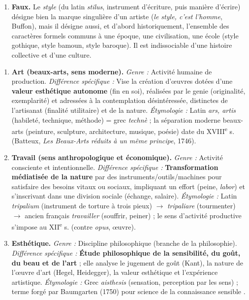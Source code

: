 \documentclass[11pt]{article}
\newcommand{\cle}[1]{{\popxbold\color{popdark}#1}}
\begin{document}
\begin{corrige}
\begin{enumerate}
\item \textbf{Faux.} Le \emph{style} (du latin \emph{stilus}, instrument d'écriture, puis manière d'écrire) désigne bien la marque singulière d'un artiste (\emph{le style, c'est l'homme}, Buffon), mais il désigne aussi, et d'abord historiquement, l'ensemble des caractères formels communs à une époque, une civilisation, une école (style gothique, style bamoun, style baroque). Il est indissociable d'une histoire collective et d'une culture.
\end{enumerate}
\end{corrige}

\begin{corrige}
\begin{enumerate}
\item \textbf{Art (beaux-arts, sens moderne).} \emph{Genre :} Activité humaine de production. \emph{Différence spécifique :} Vise la création d'œuvres dotées d'une \textbf{valeur esthétique autonome} (fin en soi), réalisées par le \cle{genie} (originalité, exemplarité) et adressées à la contemplation désintéressée, distinctes de l'artisanat (finalité utilitaire) et de la nature. \emph{Étymologie :} Latin \emph{ars, artis} (habileté, technique, méthode) = grec \emph{technè} ; la séparation moderne \guillemotleft beaux-arts \guillemotright (peinture, sculpture, architecture, musique, poésie) date du XVIII\textsuperscript{e} s. (Batteux, \emph{Les Beaux-Arts réduits à un même principe}, 1746).
\item \textbf{Travail (sens anthropologique et économique).} \emph{Genre :} Activité consciente et intentionnelle. \emph{Différence spécifique :} \textbf{Transformation médiatisée de la nature} par des instruments/outils/machines pour satisfaire des besoins vitaux ou sociaux, impliquant un effort (peine, \emph{labor}) et s'inscrivant dans une division sociale (échange, salaire). \emph{Étymologie :} Latin \emph{tripalium} (instrument de torture à trois pieux) $\rightarrow$ \emph{tripaliare} (tourmenter) $\rightarrow$ ancien français \emph{travailler} (souffrir, peiner) ; le sens d'\guillemotleft activité productive \guillemotright s'impose au XII\textsuperscript{e} s. (contre \emph{opus}, œuvre).
\item \textbf{Esthétique.} \emph{Genre :} Discipline philosophique (branche de la philosophie). \emph{Différence spécifique :} \textbf{Étude philosophique de la sensibilité, du goût, du beau et de l'art} ; elle analyse le jugement de goût (Kant), la nature de l'œuvre d'art (Hegel, Heidegger), la valeur esthétique et l'expérience artistique. \emph{Étymologie :} Grec \emph{aisthesis} (sensation, perception par les sens) ; terme forgé par Baumgarten (1750) pour \guillemotleft science de la connaissance sensible \guillemotright.

\end{enumerate}
\end{corrige}
\end{document}
